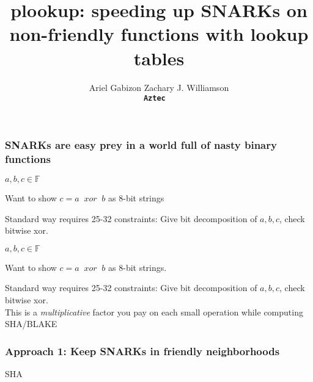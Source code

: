 \documentclass[shadesubsections,compress,14pt,mathserif]{beamer}
\title{\large{plookup: speeding up SNARKs on non-friendly functions with lookup tables}}    %
\author{\small{Ariel Gabizon  \; Zachary J. Williamson}\\                 %
\tt{\footnotesize{\;\;\;\;\;\; \textbf{Aztec}   \;\;\;\;\;\;\;\;\;\;\;\; }                                       } }      %
\date{}                    %
\newcommand{\F}{\ensuremath{\mathbb F}}
\begin{document}
\boldmath
\begin{frame}
  \titlepage
\end{frame}

\begin{frame}
\frametitle{SNARKs are easy prey in a  world full of nasty binary functions}
$a,b,c\in \F$
  \vspace{0.2in}

Want to show $c = a\;\; xor\;\; b $ as 8-bit strings\pause
  \vspace{0.2in}

Standard way requires 25-32 constraints: Give bit decomposition of $a,b,c$, check bitwise xor.
\end{frame}


\begin{frame}
$a,b,c\in \F$
  \vspace{0.2in}

Want to show $c = a\;\; xor\;\; b $ as 8-bit strings.
  \vspace{0.2in}

Standard way requires 25-32 constraints: Give bit decomposition of $a,b,c$, check bitwise xor.\\
  \vspace{0.2in}
This is a \emph{multiplicative} factor you pay on each small operation while computing SHA/BLAKE

\end{frame}




\begin{frame}
 \frametitle{Approach 1: Keep SNARKs in friendly neighborhoods}
 
  
  
  
  
  
  SHA                            
  
  
\end{frame}
\end{document}
